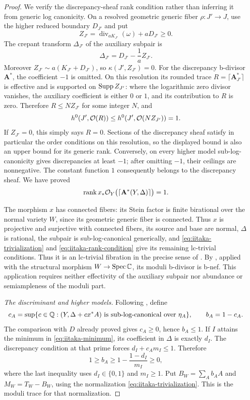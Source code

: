 \begin{proof}
We verify the discrepancy-sheaf rank condition rather than inferring
it from generic log canonicity.  On a resolved geometric generic
fiber \(\rho:J'\to J\), use the higher reduced boundary \(D_{J'}\)
and put
\[
 Z_{J'}=\operatorname{div}_{aK_{J'}}(\omega)+aD_{J'}\ge0.
\]
The crepant transform \(\Delta_{J'}\) of the auxiliary subpair is
\[
 \Delta_{J'}=D_{J'}-\frac1a Z_{J'}.
\]
Moreover \(Z_{J'}\sim a(K_{J'}+D_{J'})\), so
\(\kappa(J',Z_{J'})=0\).  For the discrepancy b-divisor
\(\mathbf A^*\), the coefficient \(-1\) is omitted.  On this
resolution its rounded trace
\(R=\lceil\mathbf A^*_{J'}\rceil\) is effective and is supported
on \(\operatorname{Supp} Z_{J'}\): where the logarithmic zero divisor vanishes,
the auxiliary coefficient is either \(0\) or \(1\), and its
contribution to \(R\) is zero.  Therefore \(R\le N Z_{J'}\) for
some integer \(N\), and
\[
 h^0(J',\mathcal O(R))\le h^0(J',\mathcal O(NZ_{J'}))=1.
\]
If \(Z_{J'}=0\), this simply says \(R=0\).  Sections of the
discrepancy sheaf satisfy in particular the order conditions on this
resolution, so the displayed bound is also an upper bound for its
generic rank.  Conversely, on every higher model sub-log-canonicity
gives discrepancies at least \(-1\); after omitting \(-1\), their
ceilings are nonnegative.  The constant function \(1\) consequently
belongs to the discrepancy sheaf.  We have proved
\begin{equation}\label{eq:iitaka-rank-condition}
 \operatorname{rank}x_*\mathcal O_Y
       \bigl(\lceil\mathbf A^*(Y,\Delta)\rceil\bigr)=1.
\end{equation}

The morphism \(x\) has connected fibers: its Stein factor is finite
birational over the normal variety \(W\), since its geometric generic
fiber is connected.  Thus \(x\) is projective and surjective with connected fibers,
its source and base are normal, \(\Delta\) is rational, the subpair is
sub-log-canonical generically, and
\eqref{eq:iitaka-trivialization} and
\eqref{eq:iitaka-rank-condition} give its remaining lc-trivial
conditions.  Thus it is an lc-trivial fibration in the precise sense of
\cite[Definition~3.2]{FG}.  By \cite[Theorem~3.6]{FG}, applied with
the structural morphism \(W\to\operatorname{Spec}\mathbb C\), its moduli
b-divisor is b-nef.  This application requires neither effectivity of
the auxiliary subpair nor abundance or semiampleness of the moduli
part.

\emph{The discriminant and higher models.}
Following \cite[\S3.4]{FG}, define
\[
 c_A=\sup\{c\in\mathbb Q:(Y,\Delta+c x^*A)
                  \text{ is sub-log-canonical over }\eta_A\},
 \qquad b_A=1-c_A.
\]
The comparison with \(D\) already proved gives \(c_A\ge0\), hence
\(b_A\le1\).  If \(I\) attains the minimum in
\eqref{eq:iitaka-minimum}, its coefficient in \(\Delta\) is exactly
\(d_I\).  The discrepancy condition at that prime forces
\(d_I+c_A m_I\le1\).  Therefore
\[
 1\ge b_A\ge1-\frac{1-d_I}{m_I}\ge0,
\]
where the last inequality uses \(d_I\in\{0,1\}\) and \(m_I\ge1\).
Put \(B_W=\sum_A b_AA\) and \(M_W=T_W-B_W\), using the
normalization \eqref{eq:iitaka-trivialization}.  This is the moduli
trace for that normalization.


\end{proof}
